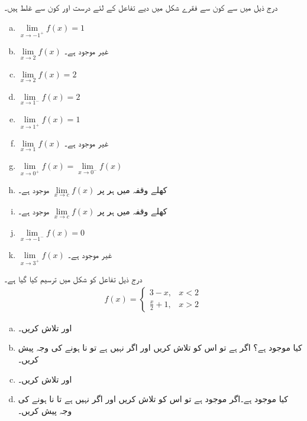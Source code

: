 درج ذیل میں سے کون سے فقرے شکل  میں دیے تفاعل کے لئے درست اور کون سے غلط ہیں۔
\begin{multicols}{2}
\begin{enumerate}[a.]
\item
$\lim\limits_{x\to -1^+}f(x)=1$
\item
$\lim\limits_{x\to 2}f(x)$
غیر موجود ہے۔
\item
$\lim\limits_{x\to 2}f(x)=2$
\item
$\lim\limits_{x\to 1^-}f(x)=2$
\item
$\lim\limits_{x\to 1^+}f(x)=1$
\item
$\lim\limits_{x\to 1}f(x)$
غیر موجود ہے۔
\item
$\lim\limits_{x\to 0^+}f(x)=\lim\limits_{x\to 0^-}f(x)$
\item
کھلے وقفہ  میں ہر  پر 
$\lim\limits_{x\to c}f(x)$
موجود ہے۔
\item
کھلے وقفہ  میں ہر  پر 
$\lim\limits_{x\to c}f(x)$
موجود ہے۔
\item
$\lim\limits_{x\to -1^-}f(x)=0$
\item
$\lim\limits_{x\to 3^+}f(x)$
غیر موجود ہے۔
\end{enumerate}
\end{multicols}
درج ذیل تفاعل کو شکل  میں ترسیم کیا گیا ہے۔
\begin{align*}
f(x)=\begin{cases} 3-x,&x<2\\ \tfrac{x}{2}+1,&x>2 \end{cases}
\end{align*}
%
\begin{enumerate}[a.]
\item
{} اور  تلاش کریں۔
\item
کیا  موجود ہے؟ اگر ہے تو اس کو تلاش کریں اور اگر نہیں ہے تو نا ہونے کی وجہ پیش کریں۔
\item
{} اور  تلاش کریں۔
\item
کیا  موجود ہے۔اگر موجود ہے تو اس کو تلاش کریں اور اگر نہیں ہے تا نا ہونے کی وجہ پیش کریں۔
\end{enumerate}
%
